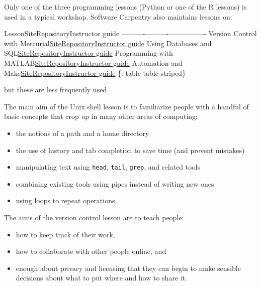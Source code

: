 Only one of the three programming lessons (Python or one of the R
lessons) is used in a typical workshop. Software Carpentry also
maintains lessons on:

\textbar{}Lesson\textbar{}Site\textbar{}Repository\textbar{}Instructor
guide\textbar{}
\textbar{}------\textbar{}----\textbar{}----------\textbar{}----------------\textbar{}
\textbar{}Version Control with
Mercurial\textbar{}\href{\{\{site.swc\_pages\}\}/hg-novice/}{Site}\textbar{}\href{https://github.com/swcarpentry/hg-novice}{Repository}\textbar{}\href{\{\{site.swc\_pages\}\}/hg-novice/guide/}{Instructor
guide} \textbar{}Using Databases and
SQL\textbar{}\href{\{\{site.swc\_pages\}\}/sql-novice-survey/}{Site}\textbar{}\href{https://github.com/swcarpentry/sql-novice-survey}{Repository}\textbar{}\href{\{\{site.swc\_pages\}\}/sql-novice-survey/guide/}{Instructor
guide} \textbar{}Programming with
MATLAB\textbar{}\href{\{\{site.swc\_pages\}\}/matlab-novice-inflammation/}{Site}\textbar{}\href{https://github.com/swcarpentry/matlab-novice-inflammation}{Repository}\textbar{}\href{\{\{site.swc\_pages\}\}/matlab-novice-inflammation/guide/}{Instructor
guide} \textbar{}Automation and
Make\textbar{}\href{\{\{site.swc\_pages\}\}/make-novice/}{Site}\textbar{}\href{https://github.com/swcarpentry/make-novice}{Repository}\textbar{}\href{\{\{site.swc\_pages\}\}/make-novice/guide/}{Instructor
guide} \{: table table-striped\}

but these are less frequently used.

The main aim of the Unix shell lesson is to familiarize people with a
handful of basic concepts that crop up in many other areas of computing:

\begin{itemize}
\itemsep1pt\parskip0pt
\item
  the notions of a path and a home directory
\item
  the use of history and tab completion to save time (and prevent
  mistakes)
\item
  manipulating text using \texttt{head}, \texttt{tail}, \texttt{grep},
  and related tools
\item
  combining existing tools using pipes instead of writing new ones
\item
  using loops to repeat operations
\end{itemize}

The aims of the version control lesson are to teach people:

\begin{itemize}
\itemsep1pt\parskip0pt
\item
  how to keep track of their work,
\item
  how to collaborate with other people online, and
\item
  enough about privacy and licensing that they can begin to make
  sensible decisions about what to put where and how to share it.
\end{itemize}

